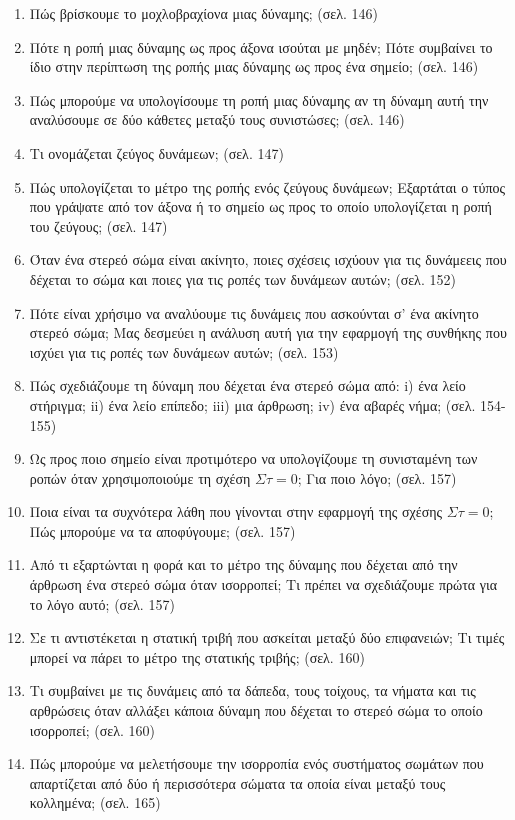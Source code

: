 \documentclass{article}
\begin{document}
\begin{enumerate}
      \item Πώς βρίσκουμε το μοχλοβραχίονα μιας δύναμης; (σελ. 146)
      \item Πότε η ροπή μιας δύναμης ως προς άξονα ισούται με μηδέν; Πότε συμβαίνει το ίδιο στην περίπτωση της ροπής μιας δύναμης ως προς ένα σημείο; (σελ. 146)
      \item Πώς μπορούμε να υπολογίσουμε τη ροπή μιας δύναμης αν τη δύναμη αυτή την αναλύσουμε σε δύο κάθετες μεταξύ τους συνιστώσες; (σελ. 146)
      \item Τι ονομάζεται ζεύγος δυνάμεων; (σελ. 147)
      \item Πώς υπολογίζεται το μέτρο της ροπής ενός ζεύγους δυνάμεων; Εξαρτάται ο τύπος που γράψατε από τον άξονα ή το σημείο ως προς το οποίο υπολογίζεται η ροπή του ζεύγους; (σελ. 147)
      \item Όταν ένα στερεό σώμα είναι ακίνητο, ποιες σχέσεις ισχύουν για τις δυνάμεεις που δέχεται το σώμα και ποιες για τις ροπές των δυνάμεων αυτών; (σελ. 152)
      \item Πότε είναι χρήσιμο να αναλύουμε τις δυνάμεις που ασκούνται σ' ένα ακίνητο στερεό σώμα; Μας δεσμεύει η ανάλυση αυτή για την εφαρμογή της συνθήκης που ισχύει για τις ροπές των δυνάμεων αυτών; (σελ. 153)
      \item Πώς σχεδιάζουμε τη δύναμη που δέχεται ένα στερεό σώμα από: i) ένα λείο στήριγμα; ii) ένα λείο επίπεδο; iii) μια άρθρωση; iv) ένα αβαρές νήμα; (σελ. 154-155)
      \item Ως προς ποιο σημείο είναι προτιμότερο να υπολογίζουμε τη συνισταμένη των ροπών όταν χρησιμοποιούμε τη σχέση $\Sigma\tau = 0$; Για ποιο λόγο; (σελ. 157)
      \item Ποια είναι τα συχνότερα λάθη που γίνονται στην εφαρμογή της σχέσης $\Sigma\tau = 0$; Πώς μπορούμε να τα αποφύγουμε; (σελ. 157)
      \item Από τι εξαρτώνται η φορά και το μέτρο της δύναμης που δέχεται από την άρθρωση ένα στερεό σώμα όταν ισορροπεί; Τι πρέπει να σχεδιάζουμε πρώτα για το λόγο αυτό; (σελ. 157)
      \item Σε τι αντιστέκεται η στατική τριβή που ασκείται μεταξύ δύο επιφανειών; Τι τιμές μπορεί να πάρει το μέτρο της στατικής τριβής; (σελ. 160)
      \item Τι συμβαίνει με τις δυνάμεις από τα δάπεδα, τους τοίχους, τα νήματα και τις αρθρώσεις όταν αλλάξει κάποια δύναμη που δέχεται το στερεό σώμα το οποίο ισορροπεί; (σελ. 160)
      \item Πώς μπορούμε να μελετήσουμε την ισορροπία ενός συστήματος σωμάτων που απαρτίζεται από δύο ή περισσότερα σώματα τα οποία είναι μεταξύ τους κολλημένα; (σελ. 165)

\end{enumerate}
\end{document}
